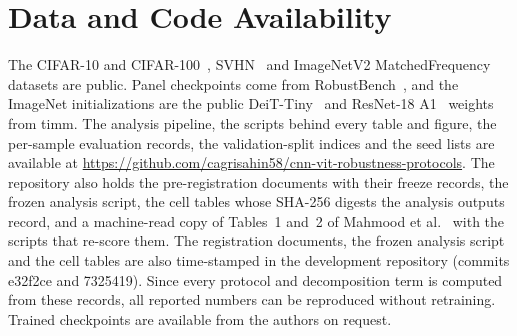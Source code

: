 \documentclass{ieeeaccess}
\begin{document}
\section*{Data and Code Availability}
The CIFAR-10 and CIFAR-100~\cite{krizhevsky2009learning}, SVHN~\cite{netzer2011reading} and ImageNetV2 MatchedFrequency~\cite{recht2019imagenet} datasets are public. Panel checkpoints come from RobustBench~\cite{croce2021robustbench}, and the ImageNet initializations are the public DeiT-Tiny~\cite{touvron2021training} and ResNet-18 A1~\cite{wightman2021resnet} weights from timm. The analysis pipeline, the scripts behind every table and figure, the per-sample evaluation records, the validation-split indices and the seed lists are available at \url{https://github.com/cagrisahin58/cnn-vit-robustness-protocols}. The repository also holds the pre-registration documents with their freeze records, the frozen analysis script, the cell tables whose SHA-256 digests the analysis outputs record, and a machine-read copy of Tables~1 and~2 of Mahmood et al.~\cite{mahmood2021robustness} with the scripts that re-score them. The registration documents, the frozen analysis script and the cell tables are also time-stamped in the development repository (commits e32f2ce and 7325419). Since every protocol and decomposition term is computed from these records, all reported numbers can be reproduced without retraining. Trained checkpoints are available from the authors on request.
\end{document}
